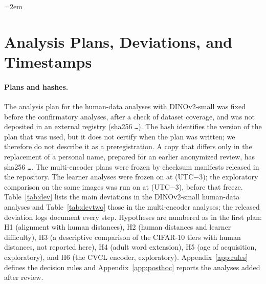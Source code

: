 \documentclass[11pt]{article}
\begin{document}
{\emergencystretch=2em\printbibliography}

\appendix
\section{Analysis Plans, Deviations, and Timestamps}
\label{app:deviations}

\paragraph{Plans and hashes.} The analysis plan for the human-data analyses with DINOv2-small was fixed before the confirmatory analyses, after a check of dataset coverage, and was not deposited in an external registry (sha256 \texttt{\PlanHash\ldots}). The hash identifies the version of the plan that was used, but it does not certify when the plan was written; we therefore do not describe it as a preregistration. A copy that differs only in the replacement of a personal name, prepared for an earlier anonymized review, has sha256 \texttt{\PlanHashAnon\ldots}. The multi-encoder plans were frozen by checksum manifests released in the repository. The learner analyses were frozen on \VtFreezeDate{} at \VtFreezeTime{} (UTC$-$3); the exploratory comparison on the same images was run on \VtXtDate{} at \VtXtTime{} (UTC$-$3), before that freeze. Table~\ref{tab:dev} lists the main deviations in the DINOv2-small human-data analyses and Table~\ref{tab:devtwo} those in the multi-encoder analyses; the released deviation logs document every step. Hypotheses are numbered as in the first plan: H1 (alignment with human distances), H2 (human distances and learner difficulty), H3 (a descriptive comparison of the CIFAR-10 tiers with human distances, not reported here), H4 (adult word extension), H5 (age of acquisition, exploratory), and H6 (the CVCL encoder, exploratory). Appendix~\ref{app:rules} defines the decision rules and Appendix~\ref{app:posthoc} reports the analyses added after review.
\end{document}
